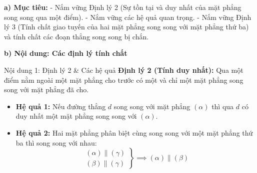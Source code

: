\documentclass[12pt, a4paper]{article}
\begin{document}
\noindent \textbf{a) Mục tiêu:}
- Nắm vững Định lý 2 (Sự tồn tại và duy nhất của mặt phẳng song song qua một điểm).
- Nắm vững các hệ quả quan trọng.
- Nắm vững Định lý 3 (Tính chất giao tuyến của hai mặt phẳng song song với mặt phẳng thứ ba) và tính chất các đoạn thẳng song song bị chắn.

\noindent \textbf{b) Nội dung: Các định lý tính chất}
\begin{pedabox}{Nội dung 1: Định lý 2 \& Các hệ quả}
\textbf{Định lý 2 (Tính duy nhất):}
Qua một điểm nằm ngoài một mặt phẳng cho trước có một và chỉ một mặt phẳng song song với mặt phẳng đã cho.
\begin{itemize}[leftmargin=0.6cm]
    \item \textbf{Hệ quả 1:} Nếu đường thẳng $d$ song song với mặt phẳng $(\alpha)$ thì qua $d$ có duy nhất một mặt phẳng song song với $(\alpha)$.
    \item \textbf{Hệ quả 2:} Hai mặt phẳng phân biệt cùng song song với một mặt phẳng thứ ba thì song song với nhau:
    $$\left.\begin{array}{l} (\alpha) \parallel (\gamma) \\ (\beta) \parallel (\gamma) \end{array}\right\} \implies (\alpha) \parallel (\beta)$$
\end{itemize}
\end{pedabox}
\end{document}
